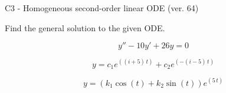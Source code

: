 \begin{exercise}
  \begin{exerciseTitle}C3 - Homogeneous second-order linear ODE (ver. 64)\end{exerciseTitle}
  \begin{exerciseStatement}
    
Find the general solution to the given ODE.

    
\[y''-10y'+26y = 0\]

  \end{exerciseStatement}
  \begin{exerciseAnswer}
    
\[y= c_{1} e^{\left(\left(i + 5\right) \, t\right)} + c_{2} e^{\left(-\left(i - 5\right) \, t\right)}\]

    
\[y= {\left(k_{1} \cos\left(t\right) + k_{2} \sin\left(t\right)\right)} e^{\left(5 \, t\right)}\]

  \end{exerciseAnswer}
\end{exercise}